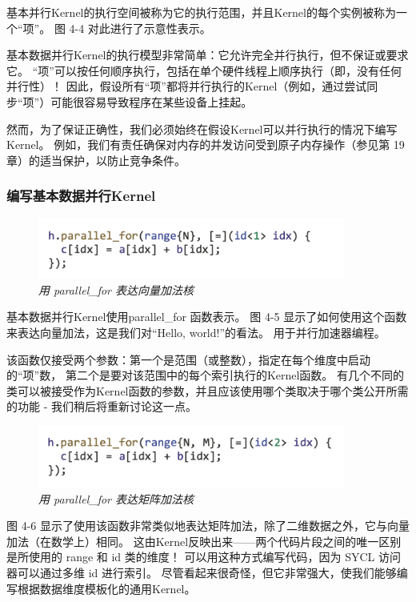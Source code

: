 基本并行Kernel的执行空间被称为它的执行范围，并且Kernel的每个实例被称为一个“项”。 图 4-4 对此进行了示意性表示。

基本数据并行Kernel的执行模型非常简单：它允许完全并行执行，但不保证或要求它。 
“项”可以按任何顺序执行，包括在单个硬件线程上顺序执行（即，没有任何并行性）！ 
因此，假设所有“项”都将并行执行的Kernel（例如，通过尝试同步“项”）可能很容易导致程序在某些设备上挂起。

然而，为了保证正确性，我们必须始终在假设Kernel可以并行执行的情况下编写Kernel。 
例如，我们有责任确保对内存的并发访问受到原子内存操作（参见第 19 章）的适当保护，以防止竞争条件。

\subsubsection{编写基本数据并行Kernel}
\begin{figure}[H]
	\centering
	\includegraphics[width=0.9\textwidth]{figs/F4.5.png}
	\caption{\textit{用 parallel\_for 表达向量加法核}}
\end{figure}

基本数据并行Kernel使用parallel\_for 函数表示。 
图 4-5 显示了如何使用这个函数来表达向量加法，这是我们对“Hello, world!”的看法。 用于并行加速器编程。

该函数仅接受两个参数：第一个是范围（或整数），指定在每个维度中启动的“项”数，
第二个是要对该范围中的每个索引执行的Kernel函数。 
有几个不同的类可以被接受作为Kernel函数的参数，并且应该使用哪个类取决于哪个类公开所需的功能 - 我们稍后将重新讨论这一点。

\begin{figure}[H]
	\centering
	\includegraphics[width=0.9\textwidth]{figs/F4.6.png}
	\caption{\textit{用 parallel\_for 表达矩阵加法核}}
\end{figure}

图 4-6 显示了使用该函数非常类似地表达矩阵加法，除了二维数据之外，它与向量加法（在数学上）相同。 
这由Kernel反映出来——两个代码片段之间的唯一区别是所使用的 range 和 id 类的维度！ 
可以用这种方式编写代码，因为 SYCL 访问器可以通过多维 id 进行索引。 
尽管看起来很奇怪，但它非常强大，使我们能够编写根据数据维度模板化的通用Kernel。

